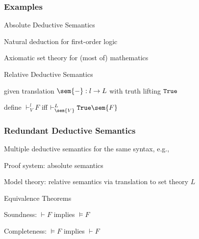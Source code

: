 \begin{frame}\frametitle{Examples}
\begin{blockitems}{Absolute Deductive Semantics}
\item Natural deduction for first-order logic
\item Axiomatic set theory for (most of) mathematics
\end{blockitems}

\begin{blockitems}{Relative Deductive Semantics}
\item given translation $\sem{-}:l\to L$ with truth lifting $\truelift$
\item define $\vdash^l_V F$ iff $\vdash^L_{\sem{V}}\truelift\sem{F}$
\end{blockitems}
\end{frame}

\begin{frame}\frametitle{Redundant Deductive Semantics}
\begin{blockitems}{Multiple deductive semantics for the same syntax, e.g.,}
\item Proof system: absolute semantics
\item Model theory: relative semantics via translation to set theory $L$
\end{blockitems}

\begin{blockitems}{Equivalence Theorems}
\item Soundness: $\vdash F$ implies $\models F$
\item Completeness: $\models F$ implies $\vdash F$
\end{blockitems}
\end{frame}

